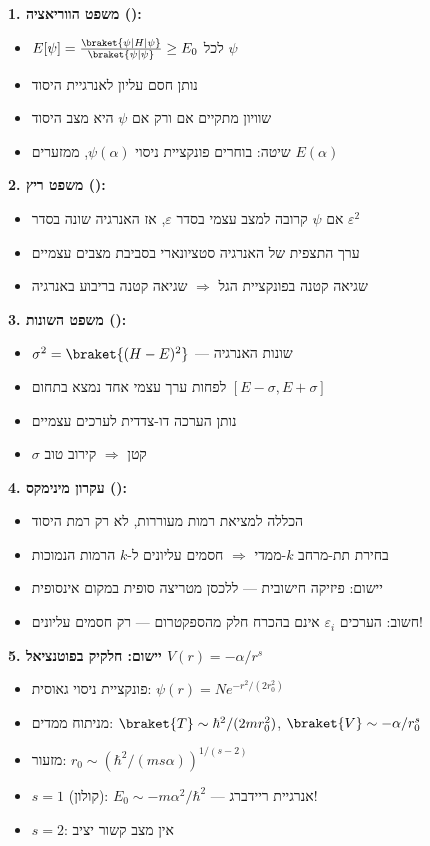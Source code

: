 \begin{summarybox}{}
\textbf{1. משפט הווריאציה ():}
\begin{itemize}
    \item $E[\psi] = \frac{\braket{\psi|H|\psi}}{\braket{\psi|\psi}} \geq E_0$ לכל $\psi$
    \item נותן חסם עליון לאנרגיית היסוד
    \item שוויון מתקיים אם ורק אם $\psi$ היא מצב היסוד
    \item שיטה: בוחרים פונקציית ניסוי $\psi(\alpha)$, ממזערים $E(\alpha)$
\end{itemize}

\textbf{2. משפט ריץ ():}
\begin{itemize}
    \item אם $\psi$ קרובה למצב עצמי בסדר $\varepsilon$, אז האנרגיה שונה בסדר $\varepsilon^2$
    \item ערך התצפית של האנרגיה סטציונארי בסביבת מצבים עצמיים
    \item שגיאה קטנה בפונקציית הגל $\Rightarrow$ שגיאה קטנה בריבוע באנרגיה
\end{itemize}

\textbf{3. משפט השונות ():}
\begin{itemize}
    \item $\sigma^2 = \braket{(H - E)^2}$ — שונות האנרגיה
    \item לפחות ערך עצמי אחד נמצא בתחום $[E - \sigma, E + \sigma]$
    \item נותן הערכה דו-צדדית לערכים עצמיים
    \item $\sigma$ קטן $\Rightarrow$ קירוב טוב
\end{itemize}

\textbf{4. עקרון מינימקס ():}
\begin{itemize}
    \item הכללה למציאת רמות מעוררות, לא רק רמת היסוד
    \item בחירת תת-מרחב $k$-ממדי $\Rightarrow$ חסמים עליונים ל-$k$ הרמות הנמוכות
    \item יישום: פיזיקה חישובית — ללכסן מטריצה סופית במקום אינסופית
    \item חשוב: הערכים $\varepsilon_i$ אינם בהכרח חלק מהספקטרום — רק חסמים עליונים!
\end{itemize}

\textbf{5. יישום: חלקיק בפוטנציאל $V(r) = -\alpha/r^s$}
\begin{itemize}
    \item פונקציית ניסוי גאוסית: $\psi(r) = Ne^{-r^2/(2r_0^2)}$
    \item מניתוח ממדים: $\braket{T} \sim \hbar^2/(2mr_0^2)$, $\braket{V} \sim -\alpha/r_0^s$
    \item מזעור: $r_0 \sim (\hbar^2/(ms\alpha))^{1/(s-2)}$
    \item $s = 1$ (קולון): $E_0 \sim -m\alpha^2/\hbar^2$ — אנרגיית ריידברג!
    \item $s = 2$: אין מצב קשור יציב
\end{itemize}


\end{summarybox}
